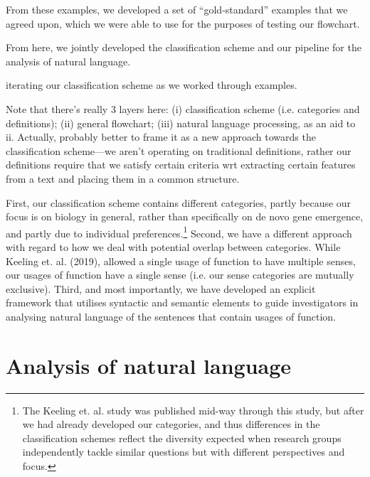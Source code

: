 \documentclass{article}
\begin{document}
From these examples, we developed a set of ``gold-standard'' examples that we agreed upon, which we were able to use for the purposes of testing our flowchart.



From here, we jointly developed the classification scheme and our pipeline for the analysis of natural language.


iterating our classification scheme as we worked through examples.

Note that there's really 3 layers here: (i) classification scheme (i.e. categories and definitions); (ii) general flowchart; (iii) natural language processing, as an aid to ii.
Actually, probably better to frame it as a new approach towards the classification scheme---we aren't operating on traditional definitions, rather our definitions require that we satisfy certain criteria wrt extracting certain features from a text and placing them in a common structure.

First, our classification scheme contains different categories, partly because our focus is on biology in general, rather than specifically on de novo gene emergence, and partly due to individual preferences.\footnote{The Keeling et. al. study was published mid-way through this study, but after we had already developed our categories, and thus differences in the classification schemes reflect the diversity expected when research groups independently tackle similar questions but with different perspectives and focus.}
Second, we have a different approach with regard to how we deal with potential overlap between categories.
While Keeling et. al. (2019), allowed a single usage of function to have multiple senses, our usages of function have a single sense (i.e. our sense categories are mutually exclusive).
Third, and most importantly, we have developed an explicit framework that utilises syntactic and semantic elements to guide investigators in analysing natural language of the sentences that contain usages of function.


\section{Analysis of natural language}
\label{sec:analys-natur-lang}
\end{document}
